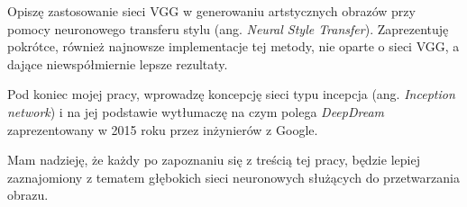 Opiszę zastosowanie sieci VGG w generowaniu artstycznych obrazów przy pomocy neuronowego transferu stylu (ang. \textit{Neural Style Transfer}). Zaprezentuję pokrótce, również najnowsze implementacje tej metody, nie oparte o sieci VGG, a dające niewspółmiernie lepsze rezultaty.

Pod koniec mojej pracy, wprowadzę koncepcję sieci typu incepcja (ang. \textit{Inception network}) i na jej
podstawie wytłumaczę na czym polega \textit{DeepDream} zaprezentowany w 2015 roku przez inżynierów z Google.

Mam nadzieję, że każdy po zapoznaniu się z treścią tej pracy, będzie lepiej zaznajomiony z tematem głębokich sieci neuronowych służących do przetwarzania obrazu.
